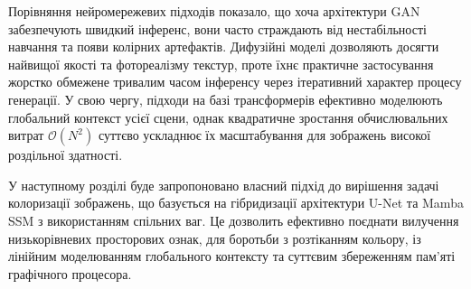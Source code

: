     Порівняння нейромережевих підходів показало, що хоча архітектури GAN забезпечують швидкий інференс, вони часто страждають від нестабільності навчання та появи колірних артефактів.
    Дифузійні моделі дозволяють досягти найвищої якості та фотореалізму текстур, проте їхнє практичне застосування жорстко обмежене тривалим часом інференсу через ітеративний характер процесу генерації.
    У свою чергу, підходи на базі трансформерів ефективно моделюють глобальний контекст усієї сцени, однак квадратичне зростання обчислювальних витрат $\mathcal{O}(N^2)$ суттєво ускладнює їх масштабування для зображень високої роздільної здатності.
    
    У наступному розділі буде запропоновано власний підхід до вирішення задачі колоризації зображень, що базується на гібридизації архітектури U-Net та Mamba SSM з використанням спільних ваг.
    Це дозволить ефективно поєднати вилучення низькорівневих просторових ознак, для боротьби з розтіканням кольору, із лінійним моделюванням глобального контексту та суттєвим збереженням пам'яті графічного процесора.